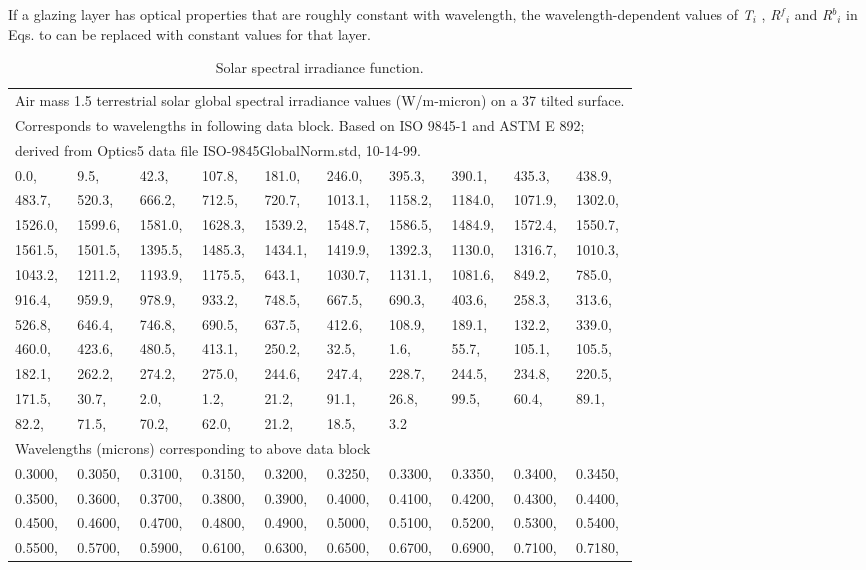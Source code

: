 If a glazing layer has optical properties that are roughly constant with wavelength, the wavelength-dependent values of \emph{T\(_{i}\)} , \emph{R\(^{f}\)\(_{i}\)} and \emph{R\(^{b}\)\(_{i}\)} in Eqs. to can be replaced with constant values for that layer.

\begin{longtable}[c]{p{0.5in}p{0.5in}p{0.5in}p{0.5in}p{0.5in}p{0.5in}p{0.5in}p{0.5in}p{0.5in}p{0.5in}}
\caption{Solar spectral irradiance function. \label{table:solar-spectral-irradiance-function.}}\\
\toprule 
\multicolumn{10}{l}{Air mass 1.5 terrestrial solar global spectral irradiance values (W/m-micron) on a 37 tilted surface.} \tabularnewline
\multicolumn{10}{l}{Corresponds to wavelengths in following data block. Based on ISO 9845-1 and ASTM E 892;} \tabularnewline
\multicolumn{10}{l}{derived from Optics5 data file ISO-9845GlobalNorm.std, 10-14-99.} \tabularnewline
\midrule
\endhead
0.0, & 9.5, & 42.3, & 107.8, & 181.0, & 246.0, & 395.3, & 390.1, & 435.3, & 438.9, \tabularnewline 
483.7, & 520.3, & 666.2, & 712.5, & 720.7, & 1013.1, & 1158.2, & 1184.0, & 1071.9, & 1302.0, \tabularnewline 
1526.0, & 1599.6, & 1581.0, & 1628.3, & 1539.2, & 1548.7, & 1586.5, & 1484.9, & 1572.4, & 1550.7, \tabularnewline 
1561.5, & 1501.5, & 1395.5, & 1485.3, & 1434.1, & 1419.9, & 1392.3, & 1130.0, & 1316.7, & 1010.3, \tabularnewline 
1043.2, & 1211.2, & 1193.9, & 1175.5, & 643.1, & 1030.7, & 1131.1, & 1081.6, & 849.2, & 785.0, \tabularnewline 
916.4, & 959.9, & 978.9, & 933.2, & 748.5, & 667.5, & 690.3, & 403.6, & 258.3, & 313.6, \tabularnewline 
526.8, & 646.4, & 746.8, & 690.5, & 637.5, & 412.6, & 108.9, & 189.1, & 132.2, & 339.0, \tabularnewline 
460.0, & 423.6, & 480.5, & 413.1, & 250.2, & 32.5, & 1.6, & 55.7, & 105.1, & 105.5, \tabularnewline 
182.1, & 262.2, & 274.2, & 275.0, & 244.6, & 247.4, & 228.7, & 244.5, & 234.8, & 220.5, \tabularnewline 
171.5, & 30.7, & 2.0, & 1.2, & 21.2, & 91.1, & 26.8, & 99.5, & 60.4, & 89.1, \tabularnewline 
82.2, & 71.5, & 70.2, & 62.0, & 21.2, & 18.5, & 3.2 \tabularnewline \midrule
\multicolumn{10}{l}{Wavelengths (microns) corresponding to above data block} \tabularnewline \midrule
0.3000, & 0.3050, & 0.3100, & 0.3150, & 0.3200, & 0.3250, & 0.3300, & 0.3350, & 0.3400, & 0.3450, \tabularnewline 
0.3500, & 0.3600, & 0.3700, & 0.3800, & 0.3900, & 0.4000, & 0.4100, & 0.4200, & 0.4300, & 0.4400, \tabularnewline  
0.4500, & 0.4600, & 0.4700, & 0.4800, & 0.4900, & 0.5000, & 0.5100, & 0.5200, & 0.5300, & 0.5400, \tabularnewline
0.5500, & 0.5700, & 0.5900, & 0.6100, & 0.6300, & 0.6500, & 0.6700, & 0.6900, & 0.7100, & 0.7180, \tabularnewline

\end{longtable}
